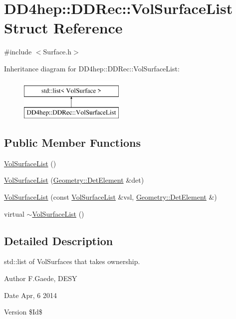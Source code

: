 \hypertarget{struct_d_d4hep_1_1_d_d_rec_1_1_vol_surface_list}{}\section{D\+D4hep\+:\+:D\+D\+Rec\+:\+:Vol\+Surface\+List Struct Reference}
\label{struct_d_d4hep_1_1_d_d_rec_1_1_vol_surface_list}


{\ttfamily \#include $<$Surface.\+h$>$}

Inheritance diagram for D\+D4hep\+:\+:D\+D\+Rec\+:\+:Vol\+Surface\+List\+:\begin{figure}[H]
\begin{center}
\leavevmode
\includegraphics[height=2.000000cm]{struct_d_d4hep_1_1_d_d_rec_1_1_vol_surface_list}
\end{center}
\end{figure}
\subsection*{Public Member Functions}
\begin{DoxyCompactItemize}
\item 
\hyperlink{struct_d_d4hep_1_1_d_d_rec_1_1_vol_surface_list_a507b0bd784bd76bd7db0f321cbeb32cc}{Vol\+Surface\+List} ()
\item 
\hyperlink{struct_d_d4hep_1_1_d_d_rec_1_1_vol_surface_list_a0a770b1964232e22b98bb900bdb785f5}{Vol\+Surface\+List} (\hyperlink{class_d_d4hep_1_1_geometry_1_1_det_element}{Geometry\+::\+Det\+Element} \&det)
\item 
\hyperlink{struct_d_d4hep_1_1_d_d_rec_1_1_vol_surface_list_a131b4d74516cb38d5dbc8192c89a03df}{Vol\+Surface\+List} (const \hyperlink{struct_d_d4hep_1_1_d_d_rec_1_1_vol_surface_list}{Vol\+Surface\+List} \&vsl, \hyperlink{class_d_d4hep_1_1_geometry_1_1_det_element}{Geometry\+::\+Det\+Element} \&)
\item 
virtual \hyperlink{struct_d_d4hep_1_1_d_d_rec_1_1_vol_surface_list_a7729277c83e494f147f21166220debd0}{$\sim$\+Vol\+Surface\+List} ()
\end{DoxyCompactItemize}


\subsection{Detailed Description}
std\+::list of Vol\+Surfaces that takes ownership. \begin{DoxyAuthor}{Author}
F.\+Gaede, D\+E\+SY 
\end{DoxyAuthor}
\begin{DoxyDate}{Date}
Apr, 6 2014 
\end{DoxyDate}
\begin{DoxyVersion}{Version}
\$\+Id\$ 
\end{DoxyVersion}


